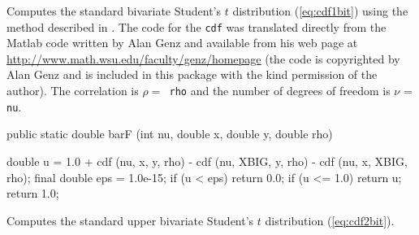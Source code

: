 \begin{code}
\begin{hide}
{      } else {
         qhrk = Math.sqrt( dh*dh + dk*dk - 2.*rho*dh*dk + nu*ors); 
         hkrn = dh*dk + rho*nu; hkn = dh*dk - nu; hpk = dh + dk;
         bvt = Math.atan2( -Math.sqrt(nu)*(hkn*qhrk+hpk*hkrn),
                            hkn*hkrn-nu*hpk*qhrk )/tpi; 
         if (bvt < -10.*eps)
            bvt = bvt + 1;
         gmph = dh/( tpi*Math.sqrt(nu)*( 1. + dh*dh/nu)); 
         gmpk = dk/( tpi*Math.sqrt(nu)*( 1. + dk*dk/nu)); 
         btnckh = Math.sqrt( xnkh ); btpdkh = btnckh;
         btnchk = Math.sqrt( xnhk ); btpdhk = btnchk; 
         for (j = 1; j <=  (nu - 1)/2; ++j) {
            bvt = bvt + gmph*( 1. + ks*btnckh ); 
            bvt = bvt + gmpk*( 1. + hs*btnchk );
            btpdkh = (2*j-1)*btpdkh*( 1. - xnkh )/(2*j);
            btnckh = btnckh + btpdkh; 
            btpdhk = (2*j-1)*btpdhk*( 1. - xnhk )/(2*j);
            btnchk = btnchk + btpdhk; 
            gmph = gmph*j/(( j + 0.5 )*( 1. + dh*dh/nu));
            gmpk = gmpk*j/(( j + 0.5 )*( 1. + dk*dk/nu));
         }
      }
      return bvt;
   }\end{hide}
\end{code}
\begin{tabb}
   Computes the standard bivariate Student's $t$ distribution (\ref{eq:cdf1bit})
   using the method described in \cite{tGEN04a}. The code for the \texttt{cdf} 
  was translated directly from the Matlab code written by Alan Genz
  and available from his web page at
  \url{http://www.math.wsu.edu/faculty/genz/homepage}
  (the code is copyrighted by Alan Genz 
  and is included in this package with the kind permission of the author).
  The correlation is $\rho = $\texttt{ rho} and the number of 
  degrees of freedom is $\nu$ = \texttt{nu}.
\end{tabb}
\begin{code}

   public static double barF (int nu, double x, double y, double rho) \begin{hide}
   {
      double u = 1.0 + cdf (nu, x, y, rho) - cdf (nu, XBIG, y, rho) -
                 cdf (nu, x, XBIG, rho);
      final double eps = 1.0e-15;
      if (u < eps) return 0.0;
      if (u <= 1.0) return u;
      return 1.0;
    }\end{hide}
\end{code}
 \begin{tabb} Computes the standard upper bivariate Student's $t$ distribution 
   (\ref{eq:cdf2bit}).
 \end{tabb}
